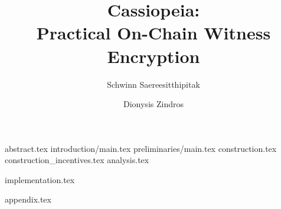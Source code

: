 \documentclass[runningheads]{llncs}
\begin{document}
\title{Cassiopeia:\\
Practical On-Chain Witness Encryption
}
\author{Schwinn Saereesitthipitak \and
Dionysis Zindros}
%
\maketitle              %
%
{abstract.tex}
{introduction/main.tex}
{preliminaries/main.tex}
{construction.tex}
{construction_incentives.tex}
{analysis.tex}






    
    
    
    


{implementation.tex}

\nocite{momo}


{appendix.tex}
\end{document}
